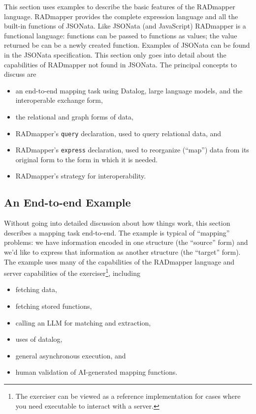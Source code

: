 \documentclass[10pt,letterpaper]{article} %
\newcommand{\stt}[1]{\texttt{#1}} %
\begin{document}
This section uses examples to describe the basic features of the RADmapper language.
RADmapper provides the complete expression language and all the built-in functions of JSONata.
Like JSONata (and JavaScript) RADmapper is a functional language: functions can be passed to functions as values; the value returned be can be a newly created function.
Examples of JSONata can be found in the JSONata specification. %
This section only goes into detail about the capabilities of RADmapper not found in JSONata.
The principal concepts to discuss are

\begin{itemize}
  \item{an end-to-end mapping task using Datalog, large language models, and the interoperable exchange form,}
  \item{the relational and graph forms of data,}
  \item{RADmapper's \stt{query} declaration, used to query relational data, and }
  \item{RADmapper's \stt{express} declaration, used to reorganize (``map'') data from its original form to the form in which it is needed.}
  \item{RADmapper's strategy for interoperability.}
\end{itemize}

\subsection{An End-to-end Example}

Without going into detailed discussion about how things work, this section describes a mapping task end-to-end.
The example is typical of ``mapping'' problems: we have information encoded in one structure (the ``source'' form) and we'd like to express that information as another structure (the ``target'' form).
The example uses many of the capabilities of the RADmapper language and server capabilities of the exerciser\footnote{The exerciser can be viewed as a reference implementation for cases where you need executable to interact with a server.}, including
\begin{itemize}
  \item{fetching data,}
  \item{fetching stored functions,}
  \item{calling an LLM for matching and extraction,}
  \item{uses of datalog,}
  \item{general asynchronous execution, and}
  \item{human validation of AI-generated mapping functions.}
  \end{itemize}
\end{document}
